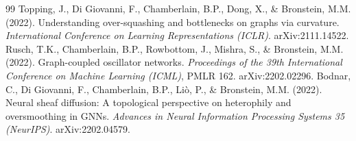 \documentclass[11pt]{article}
\begin{document}
\begin{thebibliography}{99}
 Topping, J., Di Giovanni, F., Chamberlain, B.P., Dong, X., \& Bronstein, M.M. (2022). Understanding over-squashing and bottlenecks on graphs via curvature. \emph{International Conference on Learning Representations (ICLR)}. arXiv:2111.14522.
 Rusch, T.K., Chamberlain, B.P., Rowbottom, J., Mishra, S., \& Bronstein, M.M. (2022). Graph-coupled oscillator networks. \emph{Proceedings of the 39th International Conference on Machine Learning (ICML)}, PMLR 162. arXiv:2202.02296.
 Bodnar, C., Di Giovanni, F., Chamberlain, B.P., Li\`o, P., \& Bronstein, M.M. (2022). Neural sheaf diffusion: A topological perspective on heterophily and oversmoothing in GNNs. \emph{Advances in Neural Information Processing Systems 35 (NeurIPS)}. arXiv:2202.04579.

\end{thebibliography}
\end{document}

